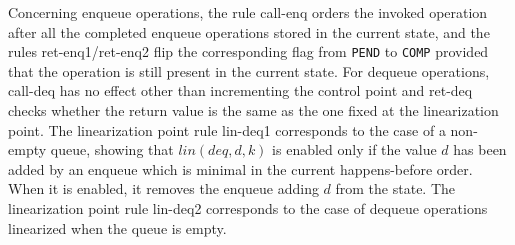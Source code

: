 Concerning enqueue operations, the rule {\sc call-enq} orders the invoked operation after all the completed enqueue operations stored in the current state, and the rules {\sc ret-enq1}/{\sc ret-enq2} flip the corresponding flag from {\tt PEND} to {\tt COMP} provided that the operation is still present in the current state. For dequeue operations, {\sc call-deq} has no effect other than incrementing the control point and {\sc ret-deq} checks whether the return value is the same as the one fixed at the linearization point. The linearization point rule {\sc lin-deq1} corresponds to the case of a non-empty queue, showing that $lin(deq,d,k)$ is enabled only if the value $d$ has been added by an enqueue which is minimal in the current happens-before order. When it is enabled, it removes the enqueue adding $d$ from the state. The linearization point rule {\sc lin-deq2} corresponds to the case of dequeue operations linearized when the queue is empty.

